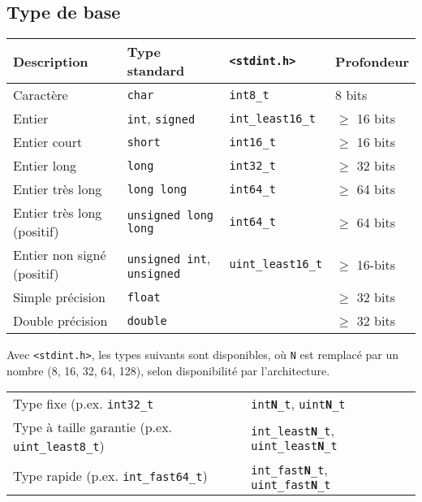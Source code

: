 \documentclass{article}
\newcommand{\cd}{\lstinline}
\begin{document}
\begin{multicols*}{3}
\subsection*{Type de base}
\begin{tabularx}{\linewidth}{X|l|l|l}
  \bf Description & \bf Type standard & \bf \texttt{<stdint.h>} & \bf Profondeur \\
  \hline
  Caractère                   & \cd{char}      & \cd {int8_t} & 8 bits \\
  \hline
  Entier                      & \cd{int}, \cd{signed}  & \cd {int_least16_t} & $\geq$ 16 bits \\
  Entier court                & \cd{short}     & \cd {int16_t} & $\geq$ 16 bits \\
  Entier long                 & \cd{long}      & \cd {int32_t} & $\geq$ 32 bits \\
  Entier très long            & \cd{long long} & \cd {int64_t} & $\geq$ 64 bits \\
  Entier très long (positif)  & \cd{unsigned long long} & \cd {int64_t} & $\geq$ 64 bits \\
  Entier non signé (positif)  & \cd{unsigned int}, \cd{unsigned} & \cd{uint_least16_t} & $\geq$ 16-bits \\
  \hline
  Simple précision            & \cd{float}     &  & $\geq$ 32 bits \\
  Double précision            & \cd{double}    &  & $\geq$ 32 bits \\
\end{tabularx}

Avec \cd{<stdint.h>}, les types suivants sont disponibles, où \cd{N} est remplacé par un nombre (8, 16, 32, 64, 128), selon disponibilité par l'architecture.

\begin{tabularx}{\linewidth}{Xl}
  Type fixe (p.ex. \texttt{int32\_t} & \texttt{int\textbf{N}\_t}, \texttt{uint\textbf{N}\_t} \\
  Type à taille garantie (p.ex. \texttt{uint\_least8\_t}) & \texttt{int\_least\textbf{N}\_t}, \texttt{uint\_least\textbf{N}\_t} \\
  Type rapide (p.ex. \texttt{int\_fast64\_t}) & \texttt{int\_fast\textbf{N}\_t}, \texttt{uint\_fast\textbf{N}\_t} \\
\end{tabularx}


\end{multicols*}
\end{document}
